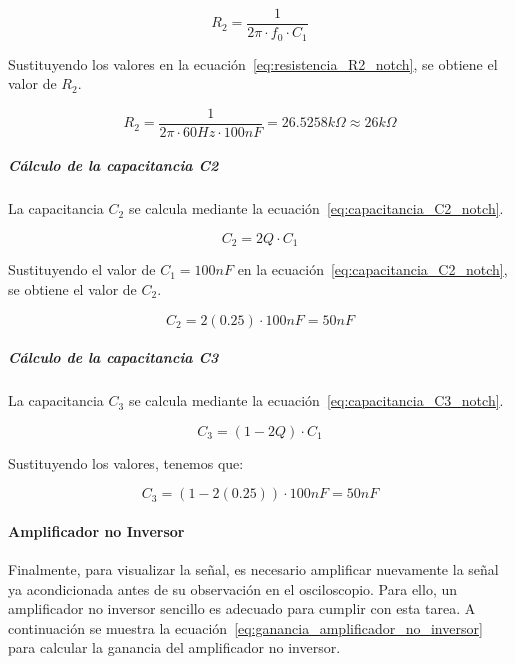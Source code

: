                     \begin{equation}
                        \label{eq:resistencia_R2_notch}
                        R_2 = \frac{1}{2\pi \cdot f_0 \cdot C_1}
                    \end{equation}

                    Sustituyendo los valores en la ecuación~\ref{eq:resistencia_R2_notch}, se obtiene el valor de $R_2$.

                    \begin{equation}
                        R_2 = \frac{1}{2\pi \cdot 60 Hz \cdot 100 nF} = 26.5258 k\Omega \approx 26 k\Omega
                    \end{equation}

                \subparagraph{Cálculo de la capacitancia C2}
                    La capacitancia $C_2$ se calcula mediante la ecuación~\ref{eq:capacitancia_C2_notch}.

                    \begin{equation}
                        \label{eq:capacitancia_C2_notch}
                        C_2 = 2Q \cdot C_1
                    \end{equation}

                    Sustituyendo el valor de $C_1 = 100 nF$ en la ecuación~\ref{eq:capacitancia_C2_notch}, se obtiene el valor de $C_2$.

                    \begin{equation}
                        C_2 = 2(0.25) \cdot 100 nF = 50 nF
                    \end{equation}

                \subparagraph{Cálculo de la capacitancia C3}
                    La capacitancia $C_3$ se calcula mediante la ecuación~\ref{eq:capacitancia_C3_notch}.

                    \begin{equation}
                        \label{eq:capacitancia_C3_notch}
                        C_3 = (1 - 2Q) \cdot C_1
                    \end{equation}

                    Sustituyendo los valores, tenemos que:

                    \begin{equation}
                        C_3 = (1 - 2(0.25)) \cdot 100 nF = 50 nF
                    \end{equation}

            \paragraph{Amplificador no Inversor}
                Finalmente, para visualizar la señal, es necesario amplificar nuevamente la señal ya acondicionada antes de su observación en el osciloscopio. Para ello, un amplificador no inversor sencillo es adecuado para cumplir con esta tarea. A continuación se muestra la ecuación~\ref{eq:ganancia_amplificador_no_inversor} para calcular la ganancia del amplificador no inversor.

